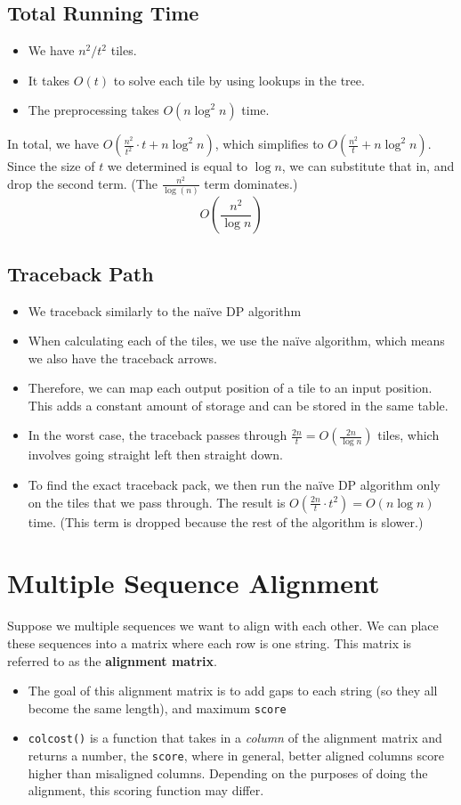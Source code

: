 \documentclass[10pt]{article}
\begin{document}
\subsection*{Total Running Time}
\begin{itemize}
	\item We have $n^2 / t^2$ tiles.
	\item It takes $O(t)$ to solve each tile by using lookups in the tree.
	\item The preprocessing takes $O(n \log^2 n)$ time.
\end{itemize}
In total, we have $O(\frac{n^2}{t^2} \cdot t + n \log^2 n)$, which simplifies to $O(\frac{n^2}{t} + n\log^2 n)$.  Since the size of $t$ we determined is equal to $\log n$, we can substitute that in, and drop the second term.  (The $\frac{n^2}{\log(n)}$ term dominates.)
\[\boxed{O\left(\frac{n^2}{\log n}\right)}\]

\subsection*{Traceback Path}
\begin{itemize}
    \item We traceback similarly to the na\"ive DP algorithm
    \item When calculating each of the tiles, we use the na\"ive algorithm, which means we also have the traceback arrows.
    \item Therefore, we can map each output position of a tile to an input position.  This adds a constant amount of storage and can be stored in the same table.
    \item In the worst case, the traceback passes through $\frac{2n}{t} = O\left(\frac{2n}{\log n}\right)$ tiles, which involves going straight left then straight down.
    \item To find the exact traceback pack, we then run the na\"ive DP algorithm only on the tiles that we pass through.  The result is $O(\frac{2n}{t} \cdot t^2) = O(n \log n)$ time.  (This term is dropped because the rest of the algorithm is slower.)
\end{itemize}

\section*{Multiple Sequence Alignment}
Suppose we multiple sequences we want to align with each other.  We can place these sequences into a matrix where each row is one string.  This matrix is referred to as the \textbf{alignment matrix}.
\begin{itemize}
	\item The goal of this alignment matrix is to add gaps to each string (so they all become the same length), and maximum \texttt{score}
	\item \texttt{colcost()} is a function that takes in a \textit{column} of the alignment matrix and returns a number, the \texttt{score}, where in general, better aligned columns score higher than misaligned columns.  Depending on the purposes of doing the alignment, this scoring function may differ.
\end{itemize}
\end{document}
